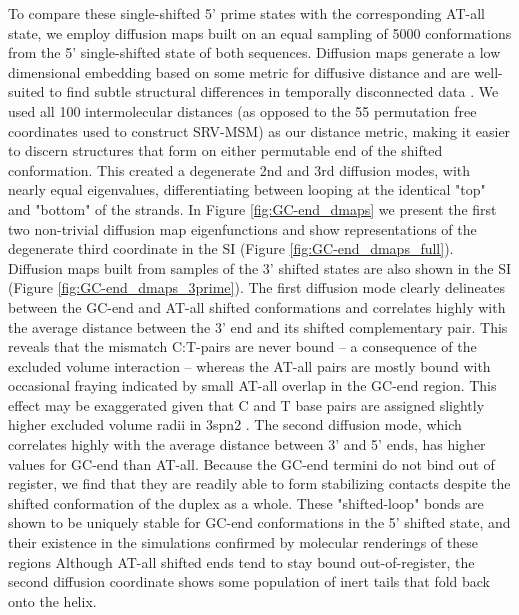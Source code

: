 \documentclass[journal=jpcbfk,manuscript=article]{achemso}
\begin{document}
To compare these single-shifted 5' prime states with the corresponding AT-all state, we employ diffusion maps built on an equal sampling of 5000 conformations from the 5' single-shifted state of both sequences. Diffusion maps generate a low dimensional embedding based on some metric for diffusive distance and are well-suited to find subtle structural differences in temporally disconnected data \citep{Coifman2006DiffusionMaps, Ferguson2010SystematicMaps}. We used all 100 intermolecular distances (as opposed to the 55 permutation free coordinates used to construct SRV-MSM) as our distance metric, making it easier to discern structures that form on either permutable end of the shifted conformation. This created a degenerate 2nd and 3rd diffusion modes, with nearly equal eigenvalues, differentiating between looping at the identical "top" and "bottom" of the strands. In Figure \ref{fig:GC-end_dmaps} we present the first two non-trivial diffusion map eigenfunctions and show representations of the degenerate third coordinate in the SI (Figure \ref{fig:GC-end_dmaps_full}). Diffusion maps built from samples of the 3' shifted states are also shown in the SI (Figure \ref{fig:GC-end_dmaps_3prime}). The first diffusion mode clearly delineates between the GC-end and AT-all shifted conformations and correlates highly with the average distance between the 3' end and its shifted complementary pair. This reveals that the mismatch C:T-pairs are never bound -- a consequence of the excluded volume interaction -- whereas the AT-all pairs are mostly bound with occasional fraying indicated by small AT-all overlap in the GC-end region. This effect may be exaggerated given that C and T base pairs are assigned slightly higher excluded volume radii in 3spn2 \citep{Hinckley2013AnHybridization}. The second diffusion mode, which correlates highly with the average distance between 3' and 5' ends, has higher values for GC-end than AT-all. Because the GC-end termini do not bind out of register, we find that they are readily able to form stabilizing contacts despite the shifted conformation of the duplex as a whole. These "shifted-loop" bonds are shown to be uniquely stable for GC-end conformations in the 5' shifted state, and their existence in the simulations confirmed by molecular renderings of these regions Although AT-all shifted ends tend to stay bound out-of-register, the second diffusion coordinate shows some population of inert tails that fold back onto the helix.

\end{document}
